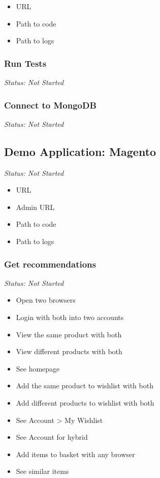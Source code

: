 \begin{itemize}
\item URL
\item Path to code
\item Path to logs
\end{itemize}

\subsubsection{Run Tests}

\emph{Status: Not Started}

\subsubsection{Connect to MongoDB}

\emph{Status: Not Started}



\subsection{Demo Application: Magento}

\emph{Status: Not Started}

\begin{itemize}
\item URL
\item Admin URL
\item Path to code
\item Path to logs
\end{itemize}

\subsubsection{Get recommendations}

\emph{Status: Not Started}

\begin{itemize}
\item Open two browsers
\item Login with both into two accounts
\item View the same product with both
\item View different products with both
\item See homepage
\item Add the same product to wishlist with both
\item Add different products to wishlist with both
\item See Account > My Wishlist
\item See Account for hybrid
\item Add items to basket with any browser
\item See similar items
\end{itemize}

